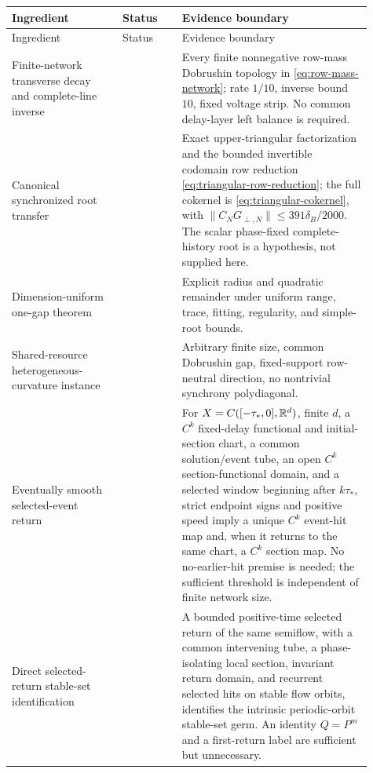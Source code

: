 \small
\begin{longtable}{@{}L{0.28\linewidth}L{0.15\linewidth}L{0.48\linewidth}@{}}
\toprule
Ingredient & Status & Evidence boundary\\
\midrule
\endfirsthead
\toprule
Ingredient & Status & Evidence boundary\\
\midrule
\endhead
\bottomrule
\endlastfoot
Finite-network transverse decay and complete-line inverse
& 
& Every finite nonnegative row-mass Dobrushin topology in
  \cref{eq:row-mass-network}; rate \(1/10\), inverse bound \(10\), fixed
  voltage strip.  No common delay-layer left balance is required.\\

Canonical synchronized root transfer
& 
& Exact upper-triangular factorization and the bounded invertible codomain
  row reduction
  \cref{eq:triangular-row-reduction}; the full cokernel is
  \cref{eq:triangular-cokernel}, with
  \(\|C_NG_{\perp,N}\|\le391\delta_B/2000\).  The scalar phase-fixed
  complete-history root is a hypothesis, not supplied here.\\

Dimension-uniform one-gap theorem
& 
& Explicit radius and quadratic remainder under uniform range, trace,
  fitting, regularity, and simple-root bounds.\\

Shared-resource heterogeneous-curvature instance
& 
& Arbitrary finite size, common Dobrushin gap, fixed-support row-neutral
  direction, no nontrivial synchrony polydiagonal.\\

Eventually smooth selected-event return
& 
& For \(X=C([-\tau_*,0],\mathbb R^d)\), finite \(d\), a \(C^k\) fixed-delay
  functional and initial-section chart, a common solution/event tube, an
  open \(C^k\) section-functional domain, and a selected window beginning
  after \(k\tau_*\), strict endpoint signs and positive speed imply a unique
  \(C^k\) event-hit map and, when it returns to the same chart, a \(C^k\)
  section map.  No no-earlier-hit premise is needed; the sufficient threshold
  is independent of finite network size.\\

Direct selected-return stable-set identification
& 
& A bounded positive-time selected return of the same semiflow, with a common
  intervening tube, a phase-isolating local section, invariant return domain,
  and recurrent selected hits on stable flow orbits, identifies the intrinsic
  periodic-orbit stable-set germ.  An identity \(Q=P^m\) and a first-return
  label are sufficient but unnecessary.\\


\end{longtable}
